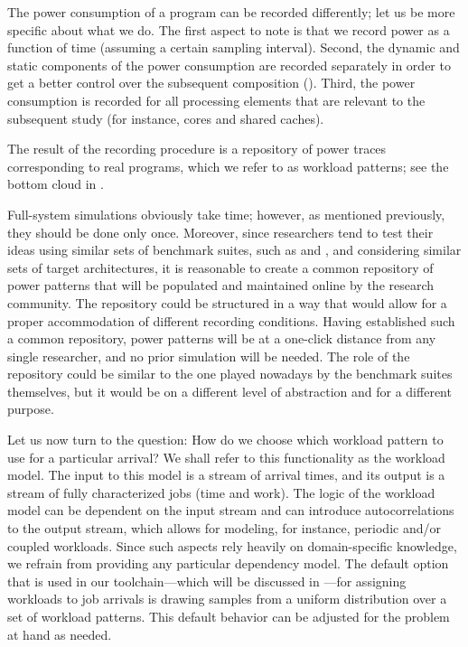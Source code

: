 The power consumption of a program can be recorded differently; let us be more
specific about what we do. The first aspect to note is that we record power as a
function of time (assuming a certain sampling interval). Second, the dynamic and
static components of the power consumption are recorded separately in order to
get a better control over the subsequent composition ().
Third, the power consumption is recorded for all processing elements that are
relevant to the subsequent study (for instance, cores and shared caches).

The result of the recording procedure is a repository of power traces
corresponding to real programs, which we refer to as workload patterns; see the
bottom cloud in .

Full-system simulations obviously take time; however, as mentioned previously,
they should be done only once. Moreover, since researchers tend to test their
ideas using similar sets of benchmark suites, such as 
\cite{bienia2011} and  \cite{cpu2006}, and considering similar
sets of target architectures, it is reasonable to create a common repository of
power patterns that will be populated and maintained online by the research
community. The repository could be structured in a way that would allow for a
proper accommodation of different recording conditions. Having established such
a common repository, power patterns will be at a one-click distance from any
single researcher, and no prior simulation will be needed. The role of the
repository could be similar to the one played nowadays by the benchmark suites
themselves, but it would be on a different level of abstraction and for a
different purpose.

Let us now turn to the question: How do we choose which workload pattern to use
for a particular arrival? We shall refer to this functionality as the workload
model. The input to this model is a stream of arrival times, and its output is a
stream of fully characterized jobs (time and work). The logic of the workload
model can be dependent on the input stream and can introduce autocorrelations to
the output stream, which allows for modeling, for instance, periodic and/or
coupled workloads. Since such aspects rely heavily on domain-specific knowledge,
we refrain from providing any particular dependency model. The default option
that is used in our toolchain---which will be discussed in
---for assigning workloads to job arrivals is drawing samples
from a uniform distribution over a set of workload patterns. This default
behavior can be adjusted for the problem at hand as needed.

